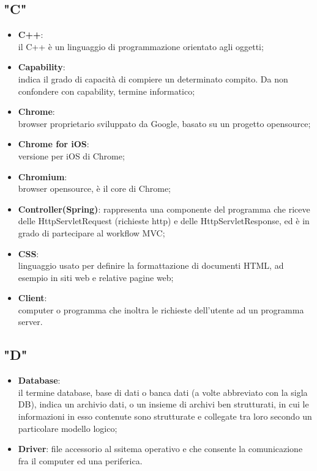 \subsection*{"C"}
\begin{itemize}
\itemsep2em
\item \textbf{C++}:\\ il C++ è un linguaggio di programmazione orientato agli oggetti;
\item \textbf{Capability}:\\ indica il grado di capacità di compiere un determinato compito. Da non confondere con capability, termine informatico;
\item \textbf{Chrome}:\\ browser proprietario sviluppato da Google, basato su un progetto opensource;
\item \textbf{Chrome for iOS}:\\ versione per iOS di Chrome;
\item \textbf{Chromium}:\\ browser opensource, è il core di Chrome;
\item \textbf{Controller(Spring)}: rappresenta una componente del programma che riceve delle HttpServletRequest (richieste http) e delle HttpServletResponse, ed è in grado di partecipare al workflow MVC;
\item \textbf{CSS}:\\ linguaggio usato per definire la formattazione di documenti HTML, ad esempio in siti web e relative pagine web;
\item \textbf{Client}:\\ computer o programma che inoltra le richieste dell’utente ad un programma server.
\end{itemize}

\subsection*{"D"}
\begin{itemize}
\itemsep2em
\item \textbf{Database}:\\ il termine database, base di dati o banca dati (a volte abbreviato con la sigla DB), indica un archivio dati, o un insieme di archivi ben strutturati, in cui le informazioni in esso contenute sono strutturate e collegate tra loro secondo un particolare modello logico;
\item \textbf{Driver}: file accessorio al ssitema operativo e che consente la comunicazione fra il computer ed una periferica.
\end{itemize}

